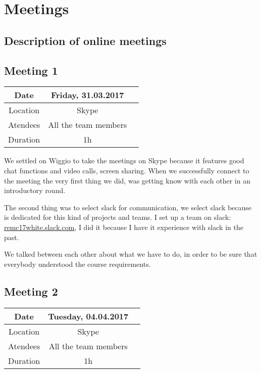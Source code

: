 
\chapter{Meetings} %

\label{Meetings} %
\section{Description of online meetings}

\section{Meeting 1}
\begin{center}
\begin{tabular}{| c | c | c }
	\hline
	Date & Friday, 31.03.2017   \\
	\hline
	Location & Skype  \\  
	\hline
	Atendees & All the team members   \\
	\hline
	Duration & 1h  \\
	\hline
\end{tabular}	
\end{center}
We settled on Wiggio to take the meetings on Skype because it features good chat functions and video calls, screen sharing. When we successfully connect to the meeting the very first thing we did, was getting know with each other in an introductory round.

The second thing was to select slack for communication, we select slack because is dedicated for this kind of projects and teams. I set up a team on slack: \href{https://remc17white.slack.com}{remc17white.slack.com}, I did it because I have it experience with slack in the past. 

We talked between each other about what we have to do, in order to be sure that everybody understood the course requirements. 

\section{Meeting 2}
\begin{center}
	\begin{tabular}{| c | c | c }
		\hline
		Date & Tuesday, 04.04.2017\\
		\hline
		Location & Skype  \\  
		\hline
		Atendees & All the team members   \\
		\hline
		Duration & 1h  \\
		\hline
	\end{tabular}	
\end{center}


